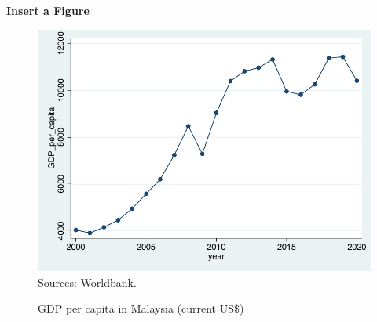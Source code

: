 \documentclass[12pt, aspectratio=169]{beamer}
\begin{document}
\linespread{1} 
\begin{frame}{\textbf{Insert a Figure}}
\linespread{1.5} 
	
	\begin{figure}
		\centering %
		\includegraphics[scale=0.45]{Fig/GDP_per_capita.pdf}\\ %
		\hspace{-9em}\scriptsize{Sources: Worldbank.}\\ %
		\vspace{-0.5em} %
		\caption{GDP per capita in Malaysia (current US\$)} %
		\label{GDP_per_capita} %
	\end{figure}
	
\end{frame}

\end{document}
